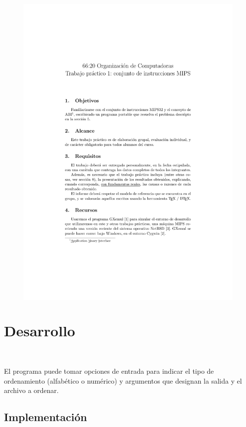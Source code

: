 \documentclass[a4paper, 12pt]{article}
\begin{document}
	\newpage
	\begin{figure}[H]
		\centering
		\includegraphics[scale=1, page = 5, clip, trim=1.5in 36mm 20mm 1.5in]{files/enunciado.pdf}
	\end{figure}
	
	\section{Desarrollo}
	\
	
		El programa puede tomar opciones de entrada para indicar el tipo de ordenamiento (alfabético o numérico) y argumentos que designan la salida y el archivo a ordenar.
		
	\subsection{Implementación}
		
\end{document}

